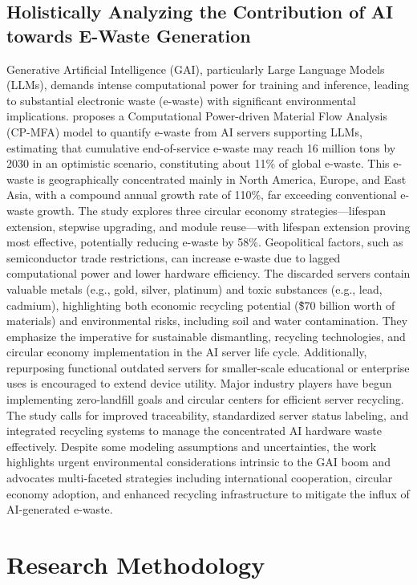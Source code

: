 \documentclass[a4paper, 12pt]{article}
\begin{document}
\subsection{Holistically Analyzing the Contribution of AI towards E-Waste Generation}
Generative Artificial Intelligence (GAI), particularly Large Language Models (LLMs), demands intense computational power for training and inference, leading to substantial electronic waste (e-waste) with significant environmental implications. \citet{wang_2024_ewaste} proposes a Computational Power-driven Material Flow Analysis (CP-MFA) model to quantify e-waste from AI servers supporting LLMs, estimating that cumulative end-of-service e-waste may reach 16 million tons by 2030 in an optimistic scenario, constituting about 11\% of global e-waste. This e-waste is geographically concentrated mainly in North America, Europe, and East Asia, with a compound annual growth rate of 110\%, far exceeding conventional e-waste growth. The study explores three circular economy strategies—lifespan extension, stepwise upgrading, and module reuse—with lifespan extension proving most effective, potentially reducing e-waste by 58\%. Geopolitical factors, such as semiconductor trade restrictions, can increase e-waste due to lagged computational power and lower hardware efficiency. The discarded servers contain valuable metals (e.g., gold, silver, platinum) and toxic substances (e.g., lead, cadmium), highlighting both economic recycling potential (\~\$70 billion worth of materials) and environmental risks, including soil and water contamination. They emphasize the imperative for sustainable dismantling, recycling technologies, and circular economy implementation in the AI server life cycle. Additionally, repurposing functional outdated servers for smaller-scale educational or enterprise uses is encouraged to extend device utility. Major industry players have begun implementing zero-landfill goals and circular centers for efficient server recycling. The study calls for improved traceability, standardized server status labeling, and integrated recycling systems to manage the concentrated AI hardware waste effectively. Despite some modeling assumptions and uncertainties, the work highlights urgent environmental considerations intrinsic to the GAI boom and advocates multi-faceted strategies including international cooperation, circular economy adoption, and enhanced recycling infrastructure to mitigate the influx of AI-generated e-waste.

\section{Research Methodology}
\end{document}
